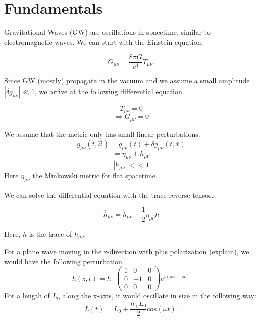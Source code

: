 \section{Fundamentals}
Gravitational Waves (GW) are oscillations in spacetime, similar to electromagnetic
waves. We can start with the Einstein equation:

\begin{equation}
    G_{\mu\nu}= \frac{8\pi G}{c^4} T_{\mu\nu}.
\end{equation}

Since GW (mostly) propagate in the vacuum and we assume a small amplitude $|\delta g_{\mu\nu}| \ll 1$, we arrive at the following differential equation.

\begin{equation}
    T_{\mu\nu} = 0
\end{equation}
\begin{equation}
    \Rightarrow G_{\mu\nu} = 0
\end{equation}


We assume that the metric only has small linear perturbations. 
\begin{equation}
    g_{\mu \nu}(t, \vec{x}) = \bar{g}_{\mu \nu}(t) + \delta g_{\mu \nu}(t, \bar{x})
\end{equation}
\begin{equation}
   = \eta_{\mu \nu} + h_{\mu \nu}
\end{equation}
\begin{equation}
    |h_{\mu \nu}| << 1
\end{equation}
Here $\eta_{ \mu \nu}$ the Minkowski metric for flat spacetime.

We can solve the differential equation with the trace reverse tensor.

\begin{equation}
    \bar{h}_{\mu\nu} = h_{\mu\nu}-\frac{1}{2} \eta_{\mu\nu}h
\end{equation}

Here, $h$ is the trace of $h_{\mu\nu}$.

For a plane wave moving in the z-direction with plus polarization (explain), we would 
have the following perturbation.
\begin{equation}
    h(z, t) = h_+ 
    \begin{pmatrix}
        1 & 0 & 0 \\ 0 & -1 & 0 \\ 0 & 0 & 0
    \end{pmatrix}
    e^{i(k z-\omega t)}
\end{equation}
For a length of $L_0$ along the x-axis, it would oscillate in size in the
following way:
\begin{equation}
    L(t) = L_0 + \frac{h_+ L_0}{2} cos(\omega t).
\end{equation}

